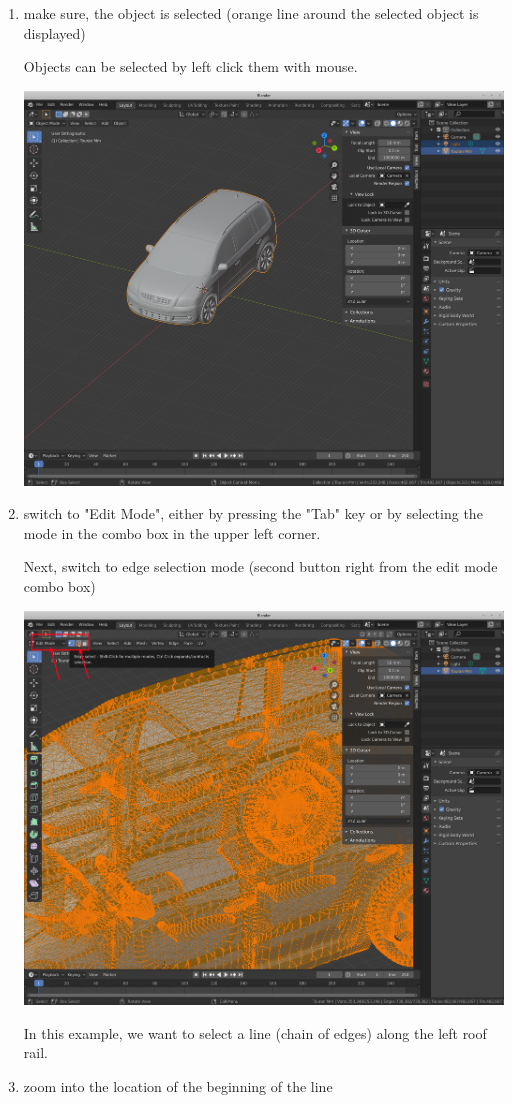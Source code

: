 \begin{enumerate}
\item make sure, the object is selected (orange line around the selected object is displayed)

Objects can be selected by left click them with mouse.

\includegraphics[width=0.75\linewidth]{figs/feature_edges_blender/03_stl_imported}

\item switch to "Edit Mode", either by pressing the "Tab" key or by selecting the mode in the combo box in the upper left corner.

Next, switch to edge selection mode (second button right from the edit mode combo box)

\includegraphics[width=0.75\linewidth]{figs/feature_edges_blender/04_edit_mode}

In this example, we want to select a line (chain of edges) along the left roof rail.

\item zoom into the location of the beginning of the line
\label{pt:begin_sel}


\end{enumerate}
